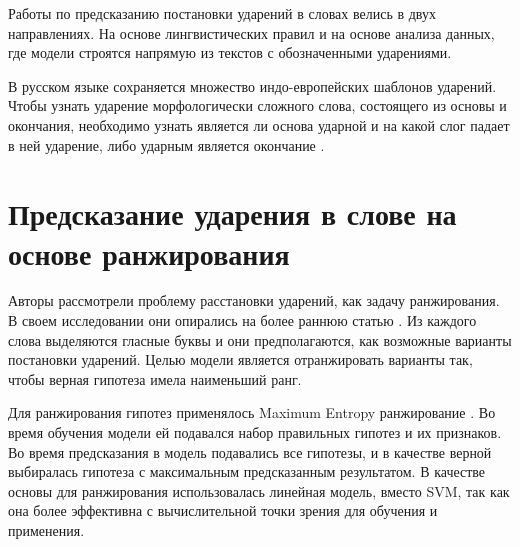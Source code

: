 \documentclass[14pt, a4paper, russian]{extreport}
\begin{document}
Работы по предсказанию постановки ударений в словах велись в двух направлениях. На основе лингвистических правил \cite{church, williams} и на основе анализа данных, где модели строятся напрямую из текстов с обозначенными ударениями. 

В русском языке сохраняется множество индо-европейских шаблонов ударений. Чтобы узнать ударение морфологически сложного слова, состоящего из основы и окончания, необходимо узнать является ли основа ударной и на какой слог падает в ней ударение, либо ударным является окончание \cite{halle}.
\section{Предсказание ударения в слове на основе ранжирования}
Авторы \cite{hall} рассмотрели проблему расстановки ударений, как задачу ранжирования. В своем исследовании  они опирались на более раннюю статью \cite{dou}. Из каждого слова выделяются гласные буквы и они предполагаются, как возможные варианты постановки ударений. Целью модели является отранжировать варианты так, чтобы верная гипотеза имела наименьший ранг.

Для ранжирования гипотез применялось Maximum Entropy ранжирование \cite{collins}. Во время обучения модели ей подавался набор правильных гипотез и их признаков. Во время предсказания в модель подавались все гипотезы, и в качестве верной выбиралась гипотеза с максимальным предсказанным результатом. В качестве основы для ранжирования использовалась линейная модель, вместо SVM, так как она более эффективна с вычислительной точки зрения для обучения и применения. 
\end{document}
